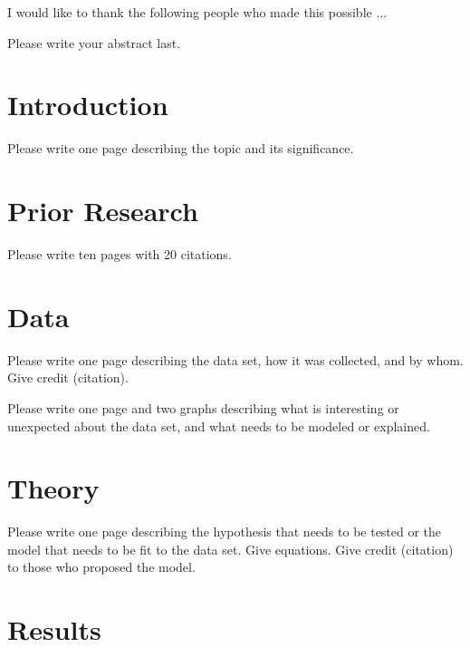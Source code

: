 \documentclass[11pt]{report}
\begin{document}

\acknowledgementspage

\noindent I would like to thank the following people who made this possible ...


\tableofcontents

\listoftables

\listoffigures

\abstractpage

Please write your abstract last.

\startofchapters

\chapter{Introduction}

Please write one page describing the topic and its significance.

\chapter{Prior Research}

Please write ten pages with 20 citations.

\chapter{Data}

Please write one page describing the data set, how it was collected,
and by whom.  Give credit (citation).

Please write one page and two graphs describing what is interesting or
unexpected about the data set, and what needs to be modeled or
explained.

\chapter{Theory}

Please write one page describing the hypothesis that needs to be
tested or the model that needs to be fit to the data set.  Give
equations.  Give credit (citation) to those who proposed the model.

\chapter{Results}
\end{document}
